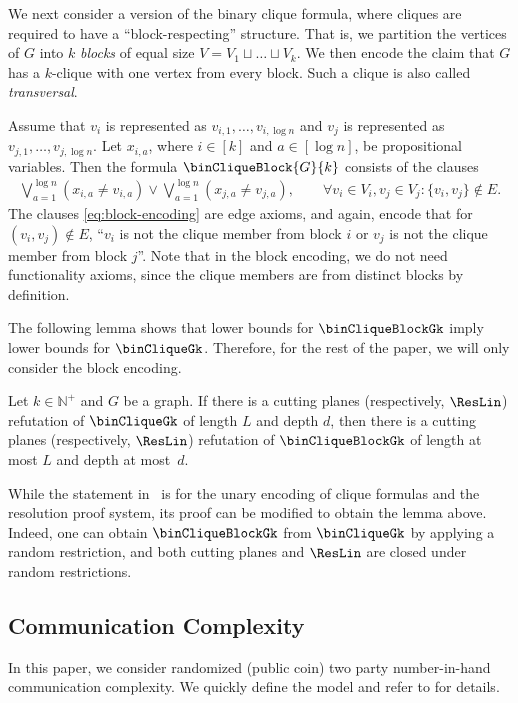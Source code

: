 We next consider a version of the binary clique formula, where cliques are required to have a ``block-respecting'' structure. 
That is, we partition the vertices of $G$ into $k$ \emph{blocks} of equal size $V=V_1 \sqcup \dots \sqcup V_k$.
We then encode the claim that $G$ has a $k$-clique with one vertex from every block. Such a clique is also called \emph{transversal}.

Assume that $v_i$ is represented as 
$v_{i,1}, \dots, v_{i, \log n}$ and $v_j$ is represented as 
$v_{j,1}, \dots, v_{j, \log n}$. Let $x_{i,a}$, where $i\in [k]$ and $a \in [\log n]$, be propositional variables. Then the formula $\binCliqueBlock{G}{k}$ consists of the clauses
\begin{align}
    \bigvee_{a=1}^{\log n} (x_{i,a}\neq v_{i,a}) \lor  \bigvee_{a=1}^{\log n} (x_{j,a}\neq v_{j,a}), 
    \qquad \forall v_i\in V_i, v_j \in V_j: \{v_i,v_j\}\notin E.
    \label{eq:block-encoding}
\end{align}
The clauses \eqref{eq:block-encoding} are edge axioms, and again, encode that for $(v_i,v_j)\notin E$, ``$v_i$ is not the clique member from block $i$ or $v_j$ is not the clique member from block $j$''.
Note that in the block encoding, we do not need functionality axioms, since the clique members are from distinct blocks by definition.

The following lemma shows that lower bounds for $\binCliqueBlockGk$ imply lower bounds for $\binCliqueGk$. Therefore, for the rest of the paper, we will only consider the block encoding.
\begin{lemma}\label{lem:blockToBinary}
    Let $k\in \mathbb{N}^+$ and $G$ be a graph. 
    If there is a cutting planes (respectively, $\ResLin$) refutation of $\binCliqueGk$ of length $L$ and depth $d$, then there is a cutting planes (respectively, $\ResLin$) refutation of $\binCliqueBlockGk$ of length at most $L$ and depth at most~$d$. 
\end{lemma}
While the statement in~\cite{BIS07IndependentSets} is for the unary encoding of clique formulas and the resolution proof system, its proof can be modified to obtain the lemma above. 
Indeed, 
one can obtain $\binCliqueBlockGk$ from $\binCliqueGk$ by applying a random restriction, and both cutting planes and $\ResLin
$ are closed under random restrictions.

\subsection{Communication Complexity}
In this paper, we consider randomized (public coin)
two party
number-in-hand communication complexity. 
We quickly define the model and refer to \cite{KN97CommunicationCplx,RY20CommunicationCplx} for details.

